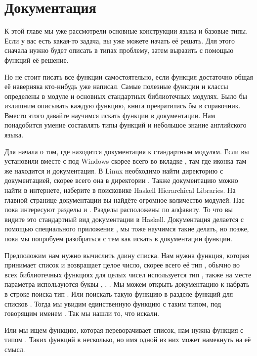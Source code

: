 \section{Документация}

К этой главе мы уже рассмотрели основные конструкции языка
и базовые типы. Если у вас есть какая-то задача, вы уже можете
начать её решать. Для этого сначала нужно будет описать
в типах проблему, затем выразить с помощью функций её решение.

Но не стоит писать все функции самостоятельно, если функция
достаточно общая её наверняка кто-нибудь уже написал. 
Самые полезные функции и классы определены в модуле 
и основных стандартных библиотечных модулях. Было бы
излишним описывать каждую функцию, книга превратилась бы в
справочник. Вместо этого давайте научимся искать функции
в документации. Нам понадобится умение составлять типы
функций и небольшое знание английского языка. 

Для начала о том, где находится документация к стандартным модулям. 
Если вы установили  вместе с  под
Windows скорее всего во вкладке , там где иконка 
там же находится и документация. В Linux необходимо найти 
директорию с документацией, скорее всего она в директории
. Также документацию
можно найти в интернете, наберите в поисковике 
Haskell Hierarchical Libraries. На главной странице документации
вы найдёте огромное количество модулей. Нас пока интересуют
разделы  и . Разделы расположены по алфавиту.
То что вы видите это стандартный вид документации в Haskell. 
Документация делается с помощью специального приложения
, мы тоже научимся такие делать, но позже,
пока мы попробуем разобраться с тем как искать в документации
функции.  

Предположим нам нужно вычислить длину списка. Нам нужна
функция, которая принимает список и возвращает целое число,
скорее всего её тип , обычно во всех библиотечных
функциях для целых чисел используется тип , также на 
месте параметра используются буквы , , . 
Мы можем открыть документацию к  набрать в
строке поиска тип . Или поискать такую функцию
в разделе функций для списков . Тогда
мы увидим единственную функцию с таким типом, под говорящим 
именем . Так мы нашли то, что искали.

Или мы ищем функцию, которая переворачивает список, нам 
нужна функция с типом \In{[a] -> [a]}. Таких функций в 
несколько, но имя  одной из них может намекнуть
на её смысл. 

